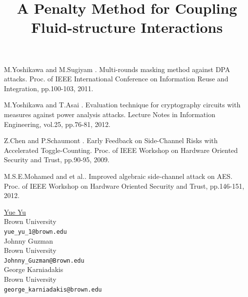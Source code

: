 \documentclass[article,A4,11pt]{llncs}%
\begin{document}

\begin{thebibliography}{10}
{\sc M.Yoshikawa  and M.Sugiyam }. {Multi-rounds masking method against DPA attacks}. Proc. of IEEE International Conference on Information Reuse and Integration, pp.100-103, 2011.

{\sc M.Yoshikawa  and T.Asai }. {Evaluation technique for cryptography circuits with measures against power analysis attacks}. Lecture Notes in Information Engineering, vol.25, pp.76-81, 2012.

{\sc Z.Chen  and P.Schaumont }. {Early Feedback on Side-Channel Risks with Accelerated Toggle-Counting}. Proc. of IEEE Workshop on Hardware Oriented Security and Trust, pp.90-95, 2009.

{\sc M.S.E.Mohamed  and et al.}. {Improved algebraic side-channel attack on AES}. Proc. of IEEE Workshop on Hardware Oriented Security and Trust, pp.146-151, 2012.
\end{thebibliography}

\title{A Penalty Method for Coupling Fluid-structure Interactions}
 \author{} \institute{}
\maketitle
\begin{center}
{\large \underline{Yue Yu}}\\
Brown University\\
{\tt yue\_yu\_1@brown.edu}
\\ \vspace{4mm}
{\large Johnny Guzman}\\
Brown University\\
{\tt Johnny\_Guzman@Brown.edu}
\\ \vspace{4mm}
{\large George Karniadakis}\\
Brown University\\
{\tt george\_karniadakis@brown.edu}
\end{center}
\end{document}
